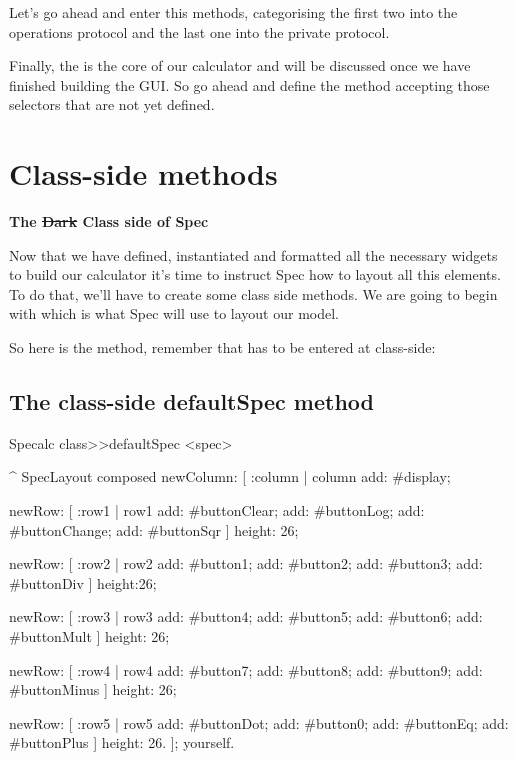 \documentclass[a4paper,10pt,twoside]{book}
\begin{document}
Let's go ahead and enter this methods, categorising the first two into the operations protocol and the last one into the private protocol.

\begin{todo}


\end{todo}

Finally, the  is the core of our calculator and will be discussed once we have finished building the GUI. So go ahead and define the  method accepting those selectors that are not yet defined. 
\section{ Class-side methods}
\textbf{The \sout{Dark} Class side of Spec}

Now that we have defined, instantiated and formatted all the necessary widgets to build our calculator it's time to instruct Spec how to layout all this elements. To do that, we'll have to create some class side methods. We are going to begin with  which is what Spec will use to layout our model.

So here is the method, remember that has to be entered at class-side:
\subsection{ The class-side defaultSpec method}

\begin{code}{}
Specalc class>>defaultSpec
	<spec>

	^ SpecLayout composed
		newColumn: [  :column | column 	add: #display;
			
				newRow: [ :row1 | row1	add: #buttonClear;
										add: #buttonLog;
										add: #buttonChange;
										add: #buttonSqr ] 
				height: 26;
			
				newRow: [ :row2 | row2 	add: #button1;
								 		add: #button2; 
								 		add: #button3;
								 		add: #buttonDiv ] 
				height:26; 
			
				newRow: [ :row3 | row3 	add: #button4;
								 		add: #button5;
								 		add: #button6;
								 		add: #buttonMult ] 
				height: 26; 
			
				newRow: [  :row4 | row4 add: #button7;
								  		add: #button8;
								  		add: #button9;
								  		add: #buttonMinus ] 
				height: 26;
			
				newRow: [  :row5 | row5 add: #buttonDot;
								  		add: #button0;
								  		add: #buttonEq;
								  		add: #buttonPlus ] 
				height: 26.
									];
		yourself.
\end{code}
\end{document}
